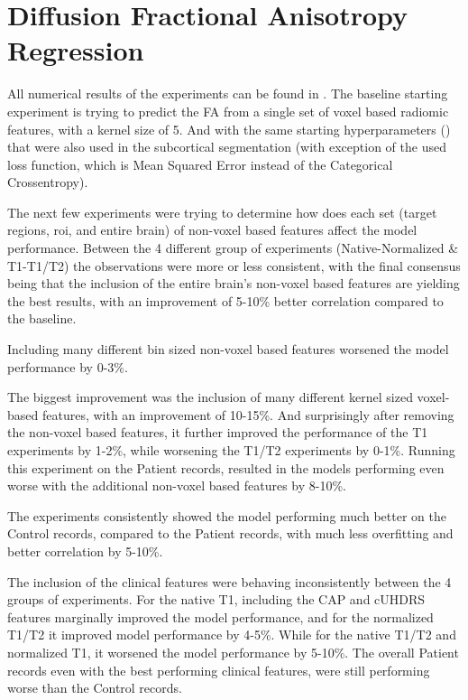 \section{Diffusion Fractional Anisotropy Regression}

All numerical results of the experiments can be found in  .
The baseline starting experiment is trying to predict the \ac{FA} from a single set of voxel based radiomic features, with a kernel size of 5. And with the same starting hyperparameters () that were also used in the subcortical segmentation (with exception of the used loss function, which is Mean Squared Error instead of the Categorical Crossentropy).\par
The next few experiments were trying to determine how does each set (target regions, roi, and entire brain) of non-voxel based features affect the model performance. Between the 4 different group of experiments (Native-Normalized \& T1-T1/T2) the observations were more or less consistent, with the final consensus being that the inclusion of the entire brain's non-voxel based features are yielding the best results, with an improvement of 5-10\% better correlation compared to the baseline.\par
Including many different bin sized non-voxel based features worsened the model performance by 0-3\%.\par
The biggest improvement was the inclusion of many different kernel sized voxel-based features, with an improvement of 10-15\%. And surprisingly after removing the non-voxel based features, it further improved the performance of the T1 experiments by 1-2\%, while worsening the T1/T2 experiments by 0-1\%. Running this experiment on the Patient records, resulted in the models performing even worse with the additional non-voxel based features by 8-10\%.\par
The experiments consistently showed the model performing much better on the Control records, compared to the Patient records, with much less overfitting and better correlation by 5-10\%.\par
The inclusion of the clinical features were behaving inconsistently between the 4 groups of experiments. For the native T1, including the \ac{CAP} and \ac{cUHDRS} features marginally improved the model performance, and for the normalized T1/T2 it improved model performance by 4-5\%. While for the native T1/T2 and normalized T1, it worsened the model performance by 5-10\%. The overall Patient records even with the best performing clinical features, were still performing worse than the Control records.\par
